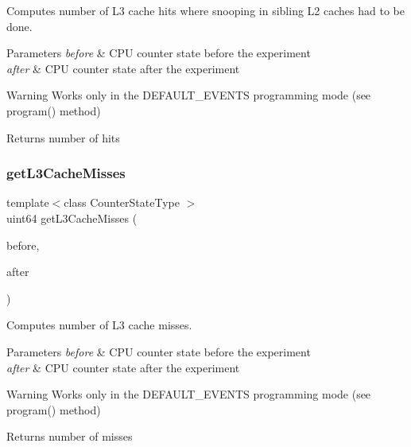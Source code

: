 Computes number of L3 cache hits where snooping in sibling L2 caches had to be done. 


\begin{DoxyParams}{Parameters}
{\em before} & C\+PU counter state before the experiment \\
\hline
{\em after} & C\+PU counter state after the experiment \\
\hline
\end{DoxyParams}
\begin{DoxyWarning}{Warning}
Works only in the D\+E\+F\+A\+U\+L\+T\+\_\+\+E\+V\+E\+N\+TS programming mode (see program() method) 
\end{DoxyWarning}
\begin{DoxyReturn}{Returns}
number of hits 
\end{DoxyReturn}
\mbox{\label{classBasicCounterState_a94118e70266db2ed7fc6b8b7b4e2c343}} 
\subsubsection{get\+L3\+Cache\+Misses}
{\footnotesize\ttfamily template$<$class Counter\+State\+Type $>$ \\
uint64 get\+L3\+Cache\+Misses (\begin{DoxyParamCaption}\item[{const Counter\+State\+Type \&}]{before,  }\item[{const Counter\+State\+Type \&}]{after }\end{DoxyParamCaption})\hspace{0.3cm}{\ttfamily [friend]}}



Computes number of L3 cache misses. 


\begin{DoxyParams}{Parameters}
{\em before} & C\+PU counter state before the experiment \\
\hline
{\em after} & C\+PU counter state after the experiment \\
\hline
\end{DoxyParams}
\begin{DoxyWarning}{Warning}
Works only in the D\+E\+F\+A\+U\+L\+T\+\_\+\+E\+V\+E\+N\+TS programming mode (see program() method) 
\end{DoxyWarning}
\begin{DoxyReturn}{Returns}
number of misses 
\end{DoxyReturn}
\mbox{\label{classBasicCounterState_a185f850a9a753d9cf4deb8299261fd4c}} 
